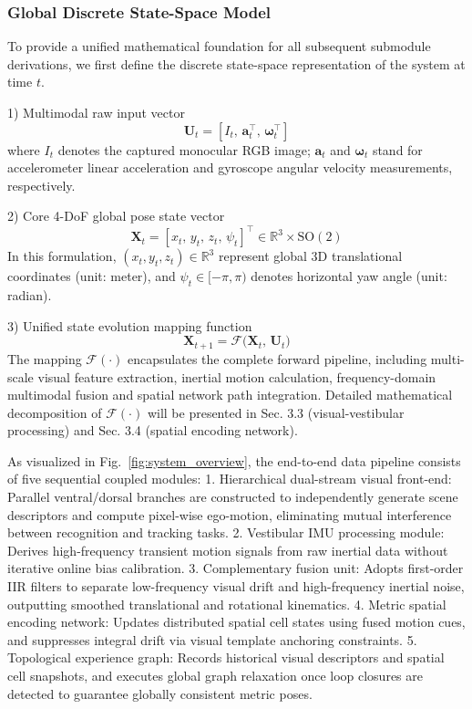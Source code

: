 \subsubsection{Global Discrete State-Space Model}
To provide a unified mathematical foundation for all subsequent submodule derivations, we first define the discrete state-space representation of the system at time $t$.

1) Multimodal raw input vector
\begin{equation}
    \mathbf{U}_t = \left[ I_t,\, \mathbf{a}_t^\top,\, \boldsymbol{\omega}_t^\top \right]
    \label{eq:input_vec}
\end{equation}
where $I_t$ denotes the captured monocular RGB image; $\mathbf{a}_t$ and $\boldsymbol{\omega}_t$ stand for accelerometer linear acceleration and gyroscope angular velocity measurements, respectively.

2) Core 4-DoF global pose state vector
\begin{equation}
    \mathbf{X}_t = \left[ x_t,\, y_t,\, z_t,\, \psi_t \right]^\top \in \mathbb{R}^3 \times \mathrm{SO}(2)
    \label{eq:global_state}
\end{equation}
In this formulation, $(x_t, y_t, z_t) \in \mathbb{R}^3$ represent global 3D translational coordinates (unit: meter), and $\psi_t \in [-\pi,\pi)$ denotes horizontal yaw angle (unit: radian).

3) Unified state evolution mapping function
\begin{equation}
    \mathbf{X}_{t+1} = \mathcal{F}\big(\mathbf{X}_t,\, \mathbf{U}_t\big)
    \label{eq:state_evolution}
\end{equation}
The mapping $\mathcal{F}(\cdot)$ encapsulates the complete forward pipeline, including multi-scale visual feature extraction, inertial motion calculation, frequency-domain multimodal fusion and spatial network path integration. Detailed mathematical decomposition of $\mathcal{F}(\cdot)$ will be presented in Sec. 3.3 (visual-vestibular processing) and Sec. 3.4 (spatial encoding network).

As visualized in Fig.~\ref{fig:system_overview}, the end-to-end data pipeline consists of five sequential coupled modules:
1. Hierarchical dual-stream visual front-end: Parallel ventral/dorsal branches are constructed to independently generate scene descriptors and compute pixel-wise ego-motion, eliminating mutual interference between recognition and tracking tasks.
2. Vestibular IMU processing module: Derives high-frequency transient motion signals from raw inertial data without iterative online bias calibration.
3. Complementary fusion unit: Adopts first-order IIR filters to separate low-frequency visual drift and high-frequency inertial noise, outputting smoothed translational and rotational kinematics.
4. Metric spatial encoding network: Updates distributed spatial cell states using fused motion cues, and suppresses integral drift via visual template anchoring constraints.
5. Topological experience graph: Records historical visual descriptors and spatial cell snapshots, and executes global graph relaxation once loop closures are detected to guarantee globally consistent metric poses.

